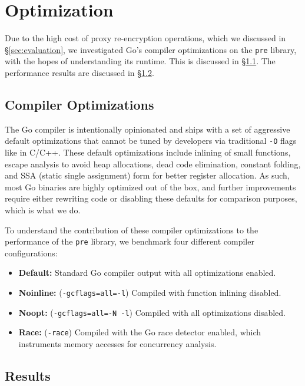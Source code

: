 \section{Optimization}
\label{sec:optimization}

Due to the high cost of proxy re-encryption operations, which we discussed in \S\ref{sec:evaluation}, we investigated Go's compiler optimizations on the \texttt{pre} library, with the hopes of understanding its runtime.
This is discussed in \S\ref{sec:compiler-optimizations}.
The performance results are discussed in \S\ref{sec:optimization-results}.

\subsection{Compiler Optimizations}
\label{sec:compiler-optimizations}

The Go compiler is intentionally opinionated and ships with a set of aggressive default optimizations that cannot be tuned by developers via traditional \texttt{-O} flags like in C/C++.
These default optimizations include inlining of small functions, escape analysis to avoid heap allocations, dead code elimination, constant folding, and SSA (static single assignment) form for better register allocation.
As such, most Go binaries are highly optimized out of the box, and further improvements require either rewriting code or disabling these defaults for comparison purposes, which is what we do.

To understand the contribution of these compiler optimizations to the performance of the \texttt{pre} library, we benchmark four different compiler configurations:

\begin{itemize}
  \item \textbf{Default:} Standard Go compiler output with all optimizations enabled.
  \item \textbf{Noinline:} (\texttt{-gcflags=all=-l}) Compiled with function inlining disabled.
  \item \textbf{Noopt:} (\texttt{-gcflags=all=-N -l}) Compiled with all optimizations disabled.
  \item \textbf{Race:} (\texttt{-race}) Compiled with the Go race detector enabled, which instruments memory accesses for concurrency analysis.
\end{itemize}


\subsection{Results}
\label{sec:optimization-results}

